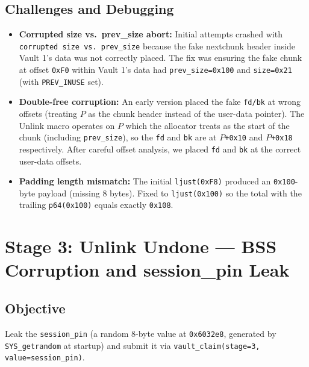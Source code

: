 \documentclass[12pt,a4paper]{article}
\begin{document}
\subsection{Challenges and Debugging}

\begin{itemize}
  \item \textbf{Corrupted size vs.\ prev\_size abort:} Initial attempts
        crashed with \texttt{corrupted size vs.\ prev\_size} because the
        fake nextchunk header inside Vault 1's data was not correctly placed.
        The fix was ensuring the fake chunk at offset \texttt{0xF0} within
        Vault 1's data had \texttt{prev\_size=0x100} and \texttt{size=0x21}
        (with \texttt{PREV\_INUSE} set).
  \item \textbf{Double-free corruption:} An early version placed the fake
        \texttt{fd/bk} at wrong offsets (treating $P$ as the chunk header
        instead of the user-data pointer). The Unlink macro operates on $P$
        which the allocator treats as the start of the chunk (including
        \texttt{prev\_size}), so the \texttt{fd} and \texttt{bk} are at
        $P$\texttt{+0x10} and $P$\texttt{+0x18} respectively. After careful
        offset analysis, we placed \texttt{fd} and \texttt{bk} at the correct
        user-data offsets.
  \item \textbf{Padding length mismatch:} The initial \texttt{ljust(0xF8)}
        produced an \texttt{0x100}-byte payload (missing 8 bytes).
        Fixed to \texttt{ljust(0x100)} so the total with the trailing
        \texttt{p64(0x100)} equals exactly \texttt{0x108}.
\end{itemize}

\newpage
\section{Stage 3: Unlink Undone — BSS Corruption and session\_pin Leak}

\subsection{Objective}

Leak the \texttt{session\_pin} (a random 8-byte value at \texttt{0x6032e8},
generated by \texttt{SYS\_getrandom} at startup) and submit it via
\texttt{vault\_claim(stage=3, value=session\_pin)}.
\end{document}
